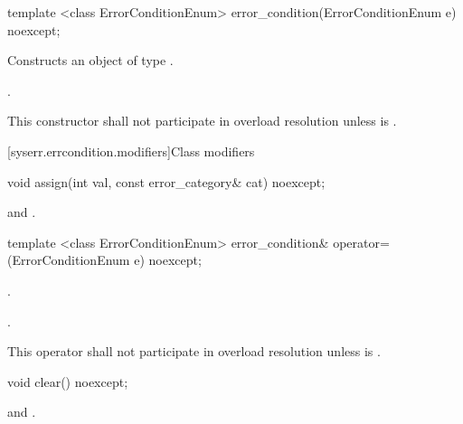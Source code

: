 %
\begin{itemdecl}
template <class ErrorConditionEnum>
  error_condition(ErrorConditionEnum e) noexcept;
\end{itemdecl}

\begin{itemdescr}
\pnum
\effects Constructs an object of type .

\pnum
\postcondition {}.

\pnum
\remarks This constructor shall not participate in overload resolution unless\linebreak
{} is .
\end{itemdescr}


[syserr.errcondition.modifiers]{Class  modifiers}

%
\begin{itemdecl}
void assign(int val, const error_category& cat) noexcept;
\end{itemdecl}

\begin{itemdescr}
\pnum
\postconditions {} and .
\end{itemdescr}

%
\begin{itemdecl}
template <class ErrorConditionEnum>
    error_condition& operator=(ErrorConditionEnum e) noexcept;
\end{itemdecl}

\begin{itemdescr}
\pnum
\postcondition {}.

\pnum
\returns {}.

\pnum
\remarks This operator shall not participate in overload resolution unless\linebreak
{} is .
\end{itemdescr}

%
\begin{itemdecl}
void clear() noexcept;
\end{itemdecl}

\begin{itemdescr}
\postconditions {} and .
\end{itemdescr}

